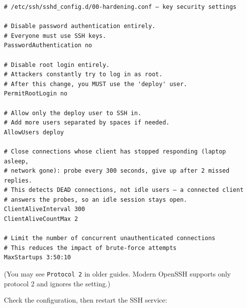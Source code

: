 \begin{codebox}[short]

\begin{Shaded}
\begin{Highlighting}[]
\end{Highlighting}
\end{Shaded}

\end{codebox}

\begin{outputbox}
\begin{Verbatim}[fontsize=\codesize, breaklines, breakanywhere, breaksymbolleft={\tiny\textcolor{muted}{$\hookrightarrow$}}]
# /etc/ssh/sshd_config.d/00-hardening.conf — key security settings

# Disable password authentication entirely.
# Everyone must use SSH keys.
PasswordAuthentication no

# Disable root login entirely.
# Attackers constantly try to log in as root.
# After this change, you MUST use the 'deploy' user.
PermitRootLogin no

# Allow only the deploy user to SSH in.
# Add more users separated by spaces if needed.
AllowUsers deploy

# Close connections whose client has stopped responding (laptop asleep,
# network gone): probe every 300 seconds, give up after 2 missed replies.
# This detects DEAD connections, not idle users — a connected client
# answers the probes, so an idle session stays open.
ClientAliveInterval 300
ClientAliveCountMax 2

# Limit the number of concurrent unauthenticated connections
# This reduces the impact of brute-force attempts
MaxStartups 3:50:10
\end{Verbatim}
\end{outputbox}

\noindent{}(You may see \texttt{Protocol\ 2} in older guides. Modern OpenSSH supports only protocol 2 and ignores the setting.)

Check the configuration, then restart the SSH service:

